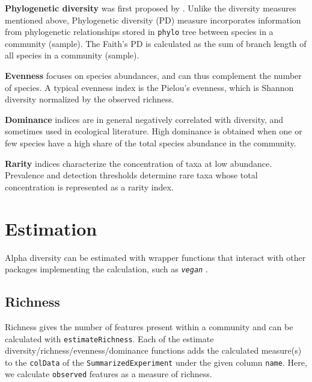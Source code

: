 \documentclass[
]{book}
\newenvironment{Shaded}{\begin{snugshade}}{\end{snugshade}}
\newcommand{\AttributeTok}[1]{\textcolor[rgb]{0.77,0.63,0.00}{#1}}
\newcommand{\FunctionTok}[1]{\textcolor[rgb]{0.00,0.00,0.00}{#1}}
\newcommand{\NormalTok}[1]{#1}
\newcommand{\OtherTok}[1]{\textcolor[rgb]{0.56,0.35,0.01}{#1}}
\newcommand{\SpecialCharTok}[1]{\textcolor[rgb]{0.00,0.00,0.00}{#1}}
\newcommand{\StringTok}[1]{\textcolor[rgb]{0.31,0.60,0.02}{#1}}
\begin{document}
\textbf{Phylogenetic diversity} was first proposed by \citep{Faith1992}. Unlike the
diversity measures mentioned above, Phylogenetic diversity (PD)
measure incorporates information from phylogenetic relationships
stored in \texttt{phylo} tree between species in a community (sample). The
Faith's PD is calculated as the sum of branch length of all species in
a community (sample).

\textbf{Evenness} focuses on species abundances, and can thus complement
the number of species. A typical evenness index is the Pielou's
evenness, which is Shannon diversity normalized by the observed
richness.

\textbf{Dominance} indices are in general negatively correlated with
diversity, and sometimes used in ecological literature. High
dominance is obtained when one or few species have a high share of
the total species abundance in the community.

\textbf{Rarity} indices characterize the concentration of taxa at low abundance.
Prevalence and detection thresholds determine rare taxa whose total concentration
is represented as a rarity index.

\hypertarget{estimation}{%
\section{Estimation}\label{estimation}}

Alpha diversity can be estimated with wrapper functions that interact
with other packages implementing the calculation, such as \emph{\texttt{vegan}}
\citep{R-vegan}.

\hypertarget{richness}{%
\subsection{Richness}\label{richness}}

Richness gives the number of features present within a community and can be calculated with \texttt{estimateRichness}. Each of the estimate diversity/richness/evenness/dominance functions adds the calculated measure(s) to the \texttt{colData} of the \texttt{SummarizedExperiment} under the given column \texttt{name}. Here, we calculate \texttt{observed} features as a measure of richness.

\begin{Shaded}
\end{Shaded}
\end{document}
